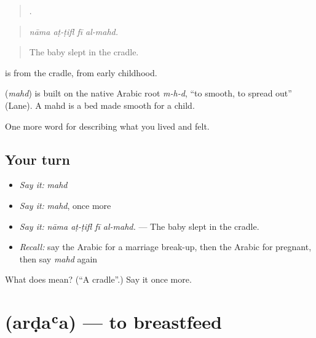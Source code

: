 \begin{quote}
   .
\end{quote}

\begin{quote}
\emph{nāma aṭ-ṭifl fī al-mahd.}
\end{quote}

\begin{quote}
The baby slept in the cradle.
\end{quote}

  is from the cradle, from early childhood.

\begin{cousinweb}
\textbf{} (\emph{mahd}) is built on the native Arabic root \emph{m-h-d}, \textquotedblleft{}to smooth, to spread out\textquotedblright{} (Lane). A mahd is a bed made smooth for a child.
\end{cousinweb}

\begin{grammarlens}[title={What you've built}]
One more word for describing what you lived and felt.
\end{grammarlens}

\subsection*{Your turn}
\begin{itemize}
\raggedright
  \item \emph{Say it:} \emph{mahd}
  \item \emph{Say it:} \emph{mahd}, once more
  \item \emph{Say it:} \emph{nāma aṭ-ṭifl fī al-mahd.} — The baby slept in the cradle.
  \item \emph{Recall:} say the Arabic for a marriage break-up, then the Arabic for pregnant, then say \emph{mahd} again
\end{itemize}

\begin{tcolorbox}[breakable,colback=teal!4,colframe=teal!35!black,title={Before you move on}]
What does  mean? (\textquotedblleft{}A cradle\textquotedblright{}.) Say it once more.
\end{tcolorbox}
\section[\texorpdfstring{\ar{أرضع} (arḍaʿa)}{أرضع (arḍaʿa)}]{ (arḍaʿa) — to breastfeed}

